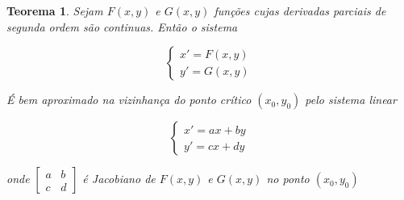 \documentclass{article}
\newtheorem{theorem}{Teorema}[section]
\begin{document}
\begin{theorem}
    Sejam $F(x, y)$ e $G(x, y)$ funções cujas derivadas parciais de segunda ordem são continuas. Então o sistema
    
    $$ \left \{
    \begin{array}{ll}
        x' = F(x, y) \\
        y' = G(x, y)
    \end{array} \right .
    $$
    
    É bem aproximado na vizinhança do ponto crítico $(x_0, y_0)$ pelo sistema linear
    
    $$ \left \{
    \begin{array}{ll}
        x' = a x + b y \\
        y' = c x + d y
    \end{array} \right .
    $$
    
    onde $\left [ \begin{array}{cc}
        a & b \\
        c & d
    \end{array} \right ]$ é Jacobiano de $F(x, y)$ e $G(x, y)$ no ponto $(x_0, y_0)$
\end{theorem}
\end{document}
